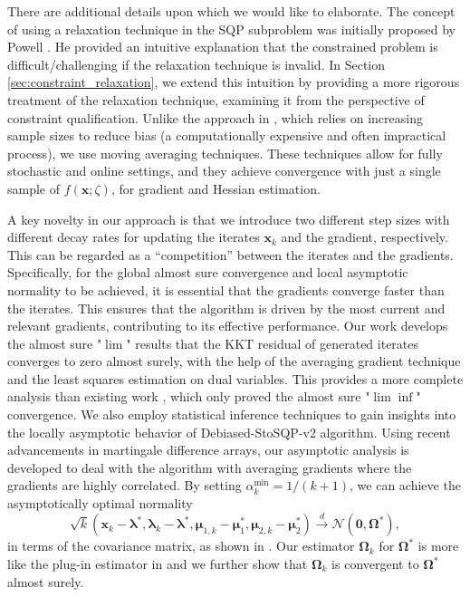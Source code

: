 \documentclass[aos]{imsart}
\numberwithin{equation}{section}
\theoremstyle{plain}
\begin{document}
There are additional details upon which we would like to elaborate. 
The concept of using a relaxation technique in the SQP subproblem was initially proposed by Powell \cite{powell2006fast}. 
He provided an intuitive explanation that the constrained problem is difficult/challenging if the relaxation technique is invalid. 
In Section \ref{sec:constraint_relaxation}, we extend this intuition by providing a more rigorous treatment of the relaxation technique, examining it from the perspective of constraint qualification.
Unlike the approach in \cite{curtis2023sequential}, which relies on increasing sample sizes to reduce bias (a computationally expensive and often impractical process), we use moving averaging techniques. 
These techniques allow for fully stochastic and online settings, and they achieve convergence with just a single sample of $f(\bm{x};\zeta)$, for gradient and Hessian estimation. 


A key novelty in our approach is that we introduce two different step sizes with different decay rates for updating the iterates $\bm{x}_k$ and the gradient, respectively.
This can be regarded as a ``competition'' between the iterates and the gradients. 
Specifically, for the global almost sure convergence and local asymptotic normality to be achieved, it is essential that the gradients converge faster than the iterates. 
This ensures that the algorithm is driven by the most current and relevant gradients, contributing to its effective performance.
Our work develops the almost sure "$\lim$" results that the KKT residual of generated iterates converges to zero almost surely, with the help of the averaging gradient technique and the least squares estimation on dual variables. 
This provides a more complete analysis than existing work \cite{curtis2023sequential}, which only proved the almost sure "$\lim \inf$" convergence.
We also employ statistical inference techniques to gain insights into the locally asymptotic behavior of Debiased-StoSQP-v2 algorithm. 
Using recent advancements in martingale difference arrays, our asymptotic analysis is developed to deal with the algorithm with averaging gradients where the gradients are highly correlated. 
By setting $\alpha_k^{\text{min}} = 1 / (k+1)$, we can achieve the asymptotically optimal normality 
$$\sqrt{k}  (\bm{x}_k - \bm{\lambda}^{*}, \bm{\lambda}_{k} - \bm{\lambda}^{*}, \bm{\mu}_{1,k} - \bm{\mu}_1^{*}, \bm{\mu}_{2,k} - \bm{\mu}_2^{*}) \stackrel{d}{\longrightarrow} \mathcal{N} \left( \bm{0}, \bm{\Omega}^{*} \right) ,$$ 
in terms of the covariance matrix, as shown in \cite{duchi2021asymptotic}. 
Our estimator  $\bm{\Omega}_k$ for $\bm{\Omega}^{*}$ is more like the plug-in estimator in \cite{chen2020statistical} and we further show that $\bm{\Omega}_k$ is convergent to $\bm{\Omega}^{*}$ almost surely.
\end{document}
